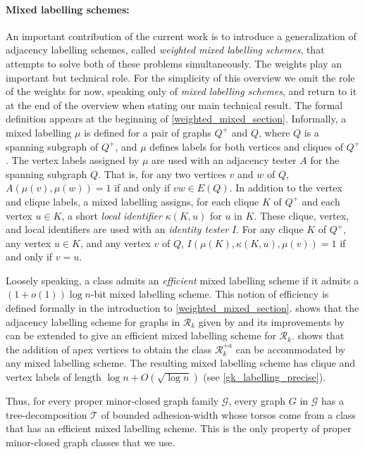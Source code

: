 \documentclass{patmorin}
\newcommand{\defin}[1]{\emph{\textcolor{brightmaroon}{#1}}}
\newcommand{\Oh}{O}
\begin{document}
\paragraph{Mixed labelling schemes:} An important contribution of the current work is to introduce a generalization of adjacency labelling schemes, called \defin{weighted mixed labelling schemes}, that attempts to solve both of these problems simultaneously. The weights play an important but technical role. For the simplicity of this overview we omit the role of the weights for now, speaking only of \emph{mixed labelling schemes}, and return to it at the end of the overview when stating our main technical result. The formal definition appears at the beginning of \cref{weighted_mixed_section}. Informally, a mixed labelling $\mu$ is defined for a pair of graphs $Q^+$ and $Q$, where $Q$ is a spanning subgraph of $Q^+$, and $\mu$ defines labels for both vertices and cliques of $Q^+$. The vertex labels assigned by $\mu$ are used with an adjacency tester $A$ for the spanning subgraph $Q$.  That is, for any two vertices $v$ and $w$ of $Q$, $A(\mu(v),\mu(w)) = 1$ if and only if $vw\in E(Q)$.  In addition to the vertex and clique labels, a mixed labelling assigns, for each clique $K$ of $Q^+$ and each vertex $u\in K$, a short \defin{local identifier} $\kappa(K,u)$ for $u$ in $K$. These clique, vertex, and local identifiers are used with an \defin{identity tester} $I$.  For any clique $K$ of $Q^+$, any vertex $u\in K$, and any vertex $v$ of $Q$, $I(\mu(K),\kappa(K,u),\mu(v))=1$ if and only if $v=u$.

Loosely speaking, a class admits an \emph{efficient} mixed labelling scheme if it admits a $(1+o(1))\log n$-bit mixed labelling scheme. This notion of efficiency is defined formally in the introduction to \cref{weighted_mixed_section}.  shows that the adjacency labelling scheme for graphs in $\mathcal{R}_k$ given by \citet{dujmovic.esperet.ea:adjacency} and its improvements by \citet{gawrychowski.janczewski:simpler} can be extended to give an efficient mixed labelling scheme for $\mathcal{R}_k$.   shows that the addition of apex vertices to obtain the class $\mathcal{R}^{+a}_k$ can be accommodated by any mixed labelling scheme.  The resulting mixed labelling scheme has clique and vertex labels of length $\log n + \Oh(\sqrt{\log n})$ (see \cref{gk_labelling_precise}).

Thus, for every proper minor-closed graph family $\mathcal{G}$, every graph $G$ in $\mathcal{G}$ has a tree-decomposition $\mathcal{T}$ of bounded adhesion-width whose torsos come from a class that has an efficient mixed labelling scheme.  This is the only property of proper minor-closed graph classes that we use.
\end{document}
